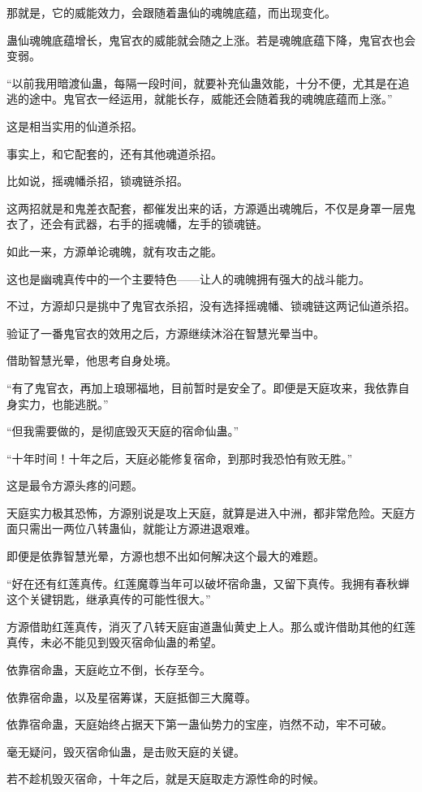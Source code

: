 \begin{this_body}
那就是，它的威能效力，会跟随着蛊仙的魂魄底蕴，而出现变化。

蛊仙魂魄底蕴增长，鬼官衣的威能就会随之上涨。若是魂魄底蕴下降，鬼官衣也会变弱。

“以前我用暗渡仙蛊，每隔一段时间，就要补充仙蛊效能，十分不便，尤其是在追逃的途中。鬼官衣一经运用，就能长存，威能还会随着我的魂魄底蕴而上涨。”

这是相当实用的仙道杀招。

事实上，和它配套的，还有其他魂道杀招。

比如说，摇魂幡杀招，锁魂链杀招。

这两招就是和鬼差衣配套，都催发出来的话，方源遁出魂魄后，不仅是身罩一层鬼衣了，还会有武器，右手的摇魂幡，左手的锁魂链。

如此一来，方源单论魂魄，就有攻击之能。

这也是幽魂真传中的一个主要特色——让人的魂魄拥有强大的战斗能力。

不过，方源却只是挑中了鬼官衣杀招，没有选择摇魂幡、锁魂链这两记仙道杀招。

验证了一番鬼官衣的效用之后，方源继续沐浴在智慧光晕当中。

借助智慧光晕，他思考自身处境。

“有了鬼官衣，再加上琅琊福地，目前暂时是安全了。即便是天庭攻来，我依靠自身实力，也能逃脱。”

“但我需要做的，是彻底毁灭天庭的宿命仙蛊。”

“十年时间！十年之后，天庭必能修复宿命，到那时我恐怕有败无胜。”

这是最令方源头疼的问题。

天庭实力极其恐怖，方源别说是攻上天庭，就算是进入中洲，都非常危险。天庭方面只需出一两位八转蛊仙，就能让方源进退艰难。

即便是依靠智慧光晕，方源也想不出如何解决这个最大的难题。

“好在还有红莲真传。红莲魔尊当年可以破坏宿命蛊，又留下真传。我拥有春秋蝉这个关键钥匙，继承真传的可能性很大。”

方源借助红莲真传，消灭了八转天庭宙道蛊仙黄史上人。那么或许借助其他的红莲真传，未必不能见到毁灭宿命仙蛊的希望。

依靠宿命蛊，天庭屹立不倒，长存至今。

依靠宿命蛊，以及星宿筹谋，天庭抵御三大魔尊。

依靠宿命蛊，天庭始终占据天下第一蛊仙势力的宝座，岿然不动，牢不可破。

毫无疑问，毁灭宿命仙蛊，是击败天庭的关键。

若不趁机毁灭宿命，十年之后，就是天庭取走方源性命的时候。


\end{this_body}
